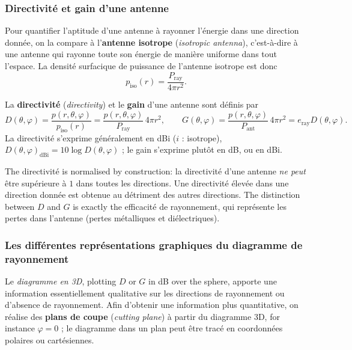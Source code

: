\subsubsection{Directivité et gain d'une antenne}

Pour quantifier l'aptitude d'une antenne à rayonner l'énergie dans une
direction donnée, on la compare à l'\textbf{antenne isotrope}
(\textit{isotropic antenna}), c'est-à-dire à une antenne qui rayonne toute son
énergie de manière uniforme dans tout l'espace. La densité surfacique de
puissance de l'antenne isotrope est donc
\[ p_{\mathrm{iso}}(r) = \frac{P_{\mathrm{ray}}}{4\pi r^2}. \]

\begin{definition}
  La \textbf{directivité} (\textit{directivity}) et le \textbf{gain} d'une
  antenne sont définis par
  \[ D(\theta,\varphi) = \frac{p(r,\theta,\varphi)}{p_{\mathrm{iso}}(r)}
     = \frac{p(r,\theta,\varphi)}{P_{\mathrm{ray}}}\, 4\pi r^2,
     \qquad
     G(\theta,\varphi) = \frac{p(r,\theta,\varphi)}{P_{\mathrm{ant}}}\, 4\pi r^2
     = e_{\mathrm{ray}} D(\theta,\varphi). \]
  La directivité s'exprime généralement en dBi ($i$ : isotrope),
  $D(\theta,\varphi)_{\mathrm{dBi}} = 10 \log D(\theta,\varphi)$ ; le gain
  s'exprime plutôt en dB, ou en dBi.
\end{definition}

\begin{remark}
  The directivité is normalised by construction: la directivité d'une antenne
  \emph{ne peut} être supérieure à $1$ dans toutes les directions. Une
  directivité élevée dans une direction donnée est obtenue au détriment des
  autres directions. The distinction between $D$ and $G$ is exactly the
  efficacité de rayonnement, qui représente les pertes dans l'antenne (pertes
  métalliques et diélectriques).
\end{remark}

\subsubsection{Les différentes représentations graphiques du diagramme de rayonnement}

Le \emph{diagramme en 3D}, plotting $D$ or $G$ in dB over the sphere, apporte
une information essentiellement qualitative sur les directions de rayonnement
ou d'absence de rayonnement. Afin d'obtenir une information plus quantitative,
on réalise des \textbf{plans de coupe} (\textit{cutting plane}) à partir du
diagramme 3D, for instance $\varphi = 0$ ; le diagramme dans un plan peut être
tracé en coordonnées polaires ou cartésiennes.

